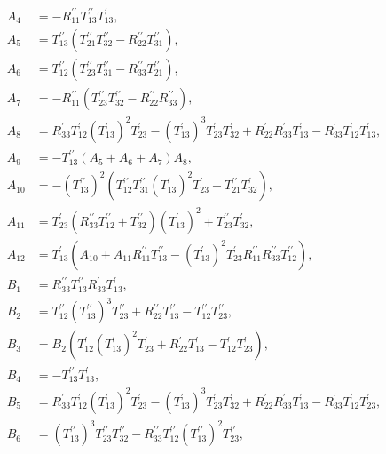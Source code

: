 \documentclass[a4 paper, 12 pt]{extarticle}
\begin{document}
   \[\begin{aligned}
   A_4 &= -R_{11}^{\prime\prime} T_{13}^{\prime\prime} T_{13}^\prime,\\
   A_5 &= T_{13}^{\prime\prime} \left(T_{21}^{\prime\prime} T_{32}^{\prime\prime} - R_{22}^{\prime\prime} T_{31}^{\prime\prime}\right),\\
   A_6 &= T_{12}^{\prime\prime} \left(T_{23}^{\prime\prime} T_{31}^{\prime\prime} - R_{33}^{\prime\prime} T_{21}^{\prime\prime}\right),\\
   A_7 &= -R_{11}^{\prime\prime} \left(T_{23}^{\prime\prime} T_{32}^{\prime\prime} - R_{22}^{\prime\prime} R_{33}^{\prime\prime}\right),\\
   A_8 &= R_{33}^\prime T_{12}^\prime (T_{13}^\prime)^2 T_{23}^\prime - (T_{13}^\prime)^3 T_{23}^\prime T_{32}^\prime + R_{22}^\prime R_{33}^\prime T_{13}^\prime - R_{33}^\prime T_{12}^\prime T_{13}^\prime,\\
   A_9 &= -T_{13}^{\prime\prime} \left(A_5 + A_6 + A_7\right) A_8,\\
   A_{10} &= -(T_{13}^{\prime\prime})^2 \left(T_{12}^{\prime\prime} T_{31}^{\prime\prime} (T_{13}^\prime)^2 T_{23}^\prime + T_{21}^{\prime\prime} T_{32}^\prime\right),\\
   A_{11} &= T_{23}^\prime \left(R_{33}^{\prime\prime} T_{12}^{\prime\prime} + T_{32}^{\prime\prime}\right) (T_{13}^\prime)^2 + T_{23}^{\prime\prime} T_{32}^\prime,\\
   A_{12} &= T_{13}^\prime \left(A_{10} + A_{11} R_{11}^{\prime\prime} T_{13}^{\prime\prime} - (T_{13}^\prime)^2 T_{23}^\prime R_{11}^{\prime\prime} R_{33}^{\prime\prime} T_{12}^{\prime\prime}\right),\\
   B_1 &= R_{33}^{\prime\prime} T_{13}^{\prime\prime} R_{33}^\prime T_{13}^\prime,\\
   B_2 &= T_{12}^{\prime\prime} (T_{13}^{\prime\prime})^3 T_{23}^{\prime\prime} + R_{22}^{\prime\prime} T_{13}^{\prime\prime} - T_{12}^{\prime\prime} T_{23}^{\prime\prime},\\
   B_3 &= B_2 \left(T_{12}^\prime (T_{13}^\prime)^2 T_{23}^\prime + R_{22}^\prime T_{13}^\prime - T_{12}^\prime T_{23}^\prime\right),\\
   B_4 &= -T_{13}^{\prime\prime} T_{13}^\prime,\\
   B_5 &= R_{33}^\prime T_{12}^\prime (T_{13}^\prime)^2 T_{23}^\prime - (T_{13}^\prime)^3 T_{23}^\prime T_{32}^\prime + R_{22}^\prime R_{33}^\prime T_{13}^\prime - R_{33}^\prime T_{12}^\prime T_{23}^\prime,\\
   B_6 &= (T_{13}^{\prime\prime})^3 T_{23}^{\prime\prime} T_{32}^{\prime\prime} - R_{33}^{\prime\prime} T_{12}^{\prime\prime} (T_{13}^{\prime\prime})^2 T_{23}^{\prime\prime}, \\

\end{aligned}\]
\end{document}
